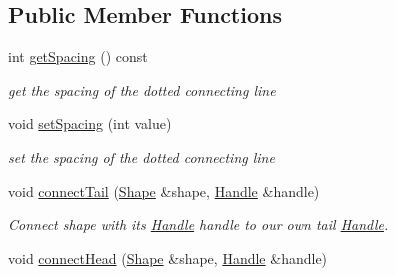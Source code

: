 \subsection*{Public Member Functions}
\begin{DoxyCompactItemize}
\item 
int \hyperlink{classcanvascv_1_1ShapesConnector_ac03d532ffefce9ce5033676a672b0b37}{get\+Spacing} () const \hypertarget{classcanvascv_1_1ShapesConnector_ac03d532ffefce9ce5033676a672b0b37}{}\label{classcanvascv_1_1ShapesConnector_ac03d532ffefce9ce5033676a672b0b37}

\begin{DoxyCompactList}\small\item\em get the spacing of the dotted connecting line \end{DoxyCompactList}\item 
void \hyperlink{classcanvascv_1_1ShapesConnector_aaa6f3f712c905df1c6dd33e535920293}{set\+Spacing} (int value)\hypertarget{classcanvascv_1_1ShapesConnector_aaa6f3f712c905df1c6dd33e535920293}{}\label{classcanvascv_1_1ShapesConnector_aaa6f3f712c905df1c6dd33e535920293}

\begin{DoxyCompactList}\small\item\em set the spacing of the dotted connecting line \end{DoxyCompactList}\item 
void \hyperlink{classcanvascv_1_1ShapesConnector_a949cf82640ba6977d8d1879702d1be89}{connect\+Tail} (\hyperlink{classcanvascv_1_1Shape}{Shape} \&shape, \hyperlink{classcanvascv_1_1Handle}{Handle} \&handle)\hypertarget{classcanvascv_1_1ShapesConnector_a949cf82640ba6977d8d1879702d1be89}{}\label{classcanvascv_1_1ShapesConnector_a949cf82640ba6977d8d1879702d1be89}

\begin{DoxyCompactList}\small\item\em Connect \textquotesingle{}shape\textquotesingle{} with it\textquotesingle{}s \hyperlink{classcanvascv_1_1Handle}{Handle} \textquotesingle{}handle\textquotesingle{} to our own tail \hyperlink{classcanvascv_1_1Handle}{Handle}. \end{DoxyCompactList}\item 
void \hyperlink{classcanvascv_1_1ShapesConnector_a1765b937ee22f9b3bf6920b0e1e4767c}{connect\+Head} (\hyperlink{classcanvascv_1_1Shape}{Shape} \&shape, \hyperlink{classcanvascv_1_1Handle}{Handle} \&handle)\hypertarget{classcanvascv_1_1ShapesConnector_a1765b937ee22f9b3bf6920b0e1e4767c}{}\label{classcanvascv_1_1ShapesConnector_a1765b937ee22f9b3bf6920b0e1e4767c}


\end{DoxyCompactItemize}
